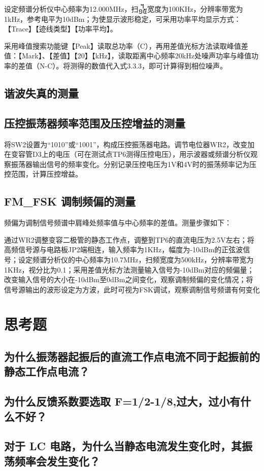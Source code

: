 \documentclass{../source/Experiment}
\begin{document}
        设定频谱分析仪中心频率为12.000MHz，扫᧿宽度为100KHz，分辨率带宽为1kHz，参考电平为10dBm；为使显示波形稳定，可采用功率平均显示方式：【Trace】【迹线类型】【功率平均】。

        采用峰值搜索功能键【Peak】读取总功率（C），再用差值光标方法读取峰值差值：【Mark】、【差值】【20】【kHz】，读取距离中心频率20kHz处噪声功率与峰值功率的差值（N-C）。将测得的数值代入式3.3.3，即可计算得到相位噪声。


        \subsection{谐波失真的测量}

        \subsection{压控振荡器频率范围及压控增益的测量}

        将SW2设置为“1010”或“1001”，构成压控振荡器电路。调节电位器WR2，改变加在变容管D3上的电压（可在测试点TP6测得压控电压），用示波器或频谱分析仪观察振荡器输出信号的频率变化。分别记录压控电压为1V和4V时的振荡频率记为压控范围，计算压控增益。

        \subsection{FM\_FSK 调制频偏的测量}

        频偏为调制信号频谱中肩峰处频率值与中心频率的差值。测量步骤如下：
        
        通过WR2调整变容二极管的静态工作点，调整到TP6的直流电压为2.5V左右；将高频信号源与电路板JP2端相连，输入频率为1KHz，幅度为-10dBm的正弦波信号；设定频谱分析仪的中心频率为10.7MHz，扫频宽度为500kHz，分辨率带宽为1KHz，视分比为0.1；采用差值光标方法测量输入信号为-10dBm对应的频偏量；改变输入信号的大小在-10dBm至0dBm之间变化，观察调制频偏的变化情况；将信号源输出的波形设定为方波，此时可视为FSK调试，观察调制信号频谱有何变化
            
    \section{思考题}
	    \subsection{为什么振荡器起振后的直流工作点电流不同于起振前的静态工作点电流？}
       
        \subsection{为什么反馈系数要选取 F=1/2-1/8,过大，过小有什么不好？}
        
        \subsection{对于 LC 电路，为什么当静态电流发生变化时，其振荡频率会发生变化？}
	
        
\end{document}
